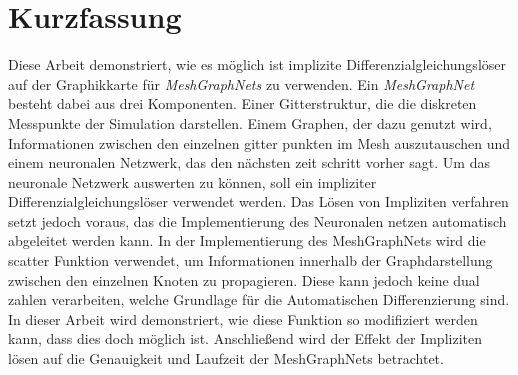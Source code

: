 \chapter*{Kurzfassung}

Diese Arbeit demonstriert, wie es möglich ist implizite Differenzialgleichungslöser 
auf der Graphikkarte für \textit{MeshGraphNets} zu verwenden.
Ein \textit{MeshGraphNet} besteht dabei aus drei Komponenten.
Einer Gitterstruktur, die die diskreten Messpunkte der Simulation darstellen.
Einem Graphen, der dazu genutzt wird, Informationen zwischen den einzelnen gitter punkten im Mesh auszutauschen
und einem neuronalen Netzwerk, das den nächsten zeit schritt vorher sagt.
Um das neuronale Netzwerk auswerten zu können, soll ein impliziter Differenzialgleichungslöser verwendet werden.
Das Lösen von Impliziten verfahren setzt jedoch voraus, das die Implementierung des Neuronalen
netzen automatisch abgeleitet werden kann.
In der Implementierung des MeshGraphNets wird die scatter Funktion verwendet, um Informationen
innerhalb der Graphdarstellung zwischen den einzelnen Knoten zu propagieren.
Diese kann jedoch keine dual zahlen verarbeiten, welche Grundlage für die Automatischen Differenzierung sind.
In dieser Arbeit wird demonstriert, wie diese Funktion so modifiziert werden kann, dass dies doch möglich ist.
Anschließend wird der Effekt der Impliziten lösen auf die Genauigkeit und Laufzeit der MeshGraphNets betrachtet.

\cleardoublepage